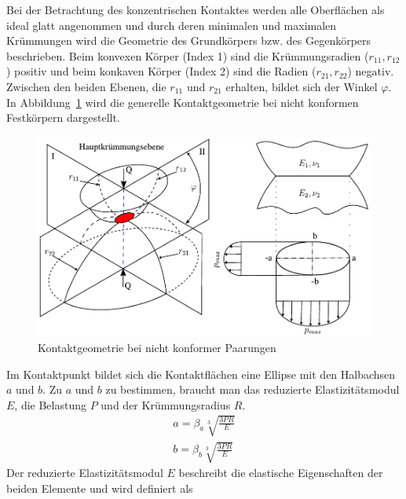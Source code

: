 Bei der Betrachtung des konzentrischen Kontaktes werden alle Oberflächen als ideal glatt angenommen und durch deren minimalen und maximalen Krümmungen wird die Geometrie des Grundkörpers bzw. des Gegenkörpers beschrieben.
Beim konvexen Körper (Index 1) sind die Krümmungsradien ($r_{11}, r_{12}$) positiv und beim konkaven Körper (Index 2) sind die Radien ($r_{21}, r_{22}$) negativ.
Zwischen den beiden Ebenen, die $r_{11}$ und $r_{21}$ erhalten, bildet sich der Winkel $\varphi$.
In Abbildung~\ref{fig:kontaktgeometrie_nichtkonforme_kontakte} wird die generelle Kontaktgeometrie bei nicht konformen Festkörpern dargestellt.
\begin{figure}[htb]
    \centering
    \includegraphics[]{./images/Hertzsche_Pressung.pdf}
    \caption{Kontaktgeometrie bei nicht konformer Paarungen\cite{psm}}
    \label{fig:kontaktgeometrie_nichtkonforme_kontakte}
\end{figure}
%
Im Kontaktpunkt bildet sich die Kontaktflächen eine Ellipse mit den Halbachsen $a$ und $b$.
Zu $a$ und $b$ zu bestimmen, braucht man das reduzierte Elastizitätsmodul $E$, die Belastung $P$ und der Krümmungsradius $R$.
\begin{align}
    a = \beta_a  \sqrt[3]{\frac{3  P  R}{E}} \label{eq:laenge_a} \\
    b = \beta_b  \sqrt[3]{\frac{3  P  R}{E}} \label{eq:laenge_b}
\end{align}
%
Der reduzierte Elastizitätsmodul $E$ beschreibt die elastische Eigenschaften der beiden Elemente und wird definiert als
